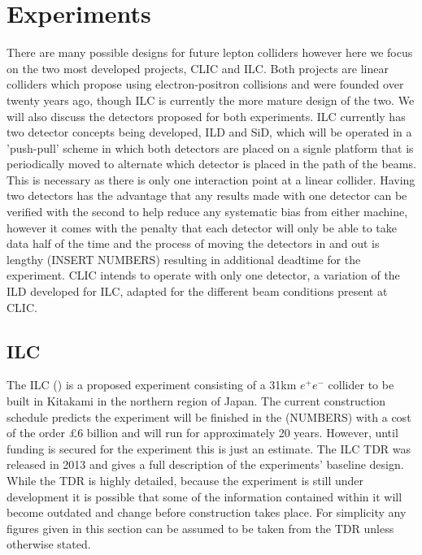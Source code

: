 \chapter{Experiments}


There are many possible designs for future lepton colliders \cite{Lipton:2012du,Koratzinos:2014cla} however here we focus on the two most developed projects, \ac{CLIC} and \ac{ILC}. Both projects are linear colliders which propose using electron-positron collisions and were founded over twenty years ago, though \ac{ILC} is currently the more mature design of the two. We will also discuss the detectors proposed for both experiments. \ac{ILC} currently has two detector concepts being developed, \ac{ILD} and \ac{SiD}, which will be operated in a 'push-pull' scheme in which both detectors are placed on a signle platform that is periodically moved to alternate which detector is placed in the path of the beams. This is necessary as there is only one interaction point at a linear collider. Having two detectors has the advantage that any results made with one detector can be verified with the second to help reduce any systematic bias from either machine, however it comes with the penalty that each detector will only be able to take data half of the time and the process of moving the detectors in and out is lengthy (INSERT NUMBERS) resulting in additional deadtime for the experiment. \ac{CLIC} intends to operate with only one detector, a variation of the \ac{ILD} developed for \ac{ILC}, adapted for the different beam conditions present at CLIC. 

\section{ILC}

The ILC () is a proposed experiment consisting of a 31km ${e^+e^-}$ collider to be built in Kitakami in the northern region of Japan. The current construction schedule predicts the experiment will be finished in the (NUMBERS) with a cost of the order \pounds6 billion and will run for approximately 20 years. However, until funding is secured for the experiment this is just an estimate. The \ac{ILC} \ac{TDR} \cite{ILCTDR} was released in 2013 and gives a full description of the experiments' baseline design. While the \ac{TDR} is highly detailed, because the experiment is still under development it is possible that some of the information contained within it will become outdated and change before construction takes place. For simplicity any figures given in this section can be assumed to be taken from the \ac{TDR} unless otherwise stated.

